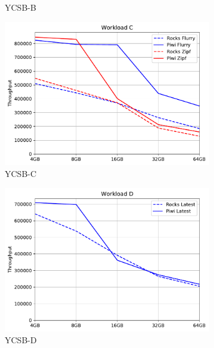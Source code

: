 \begin{figure}[tb]
\begin{subfigure}{0.3\linewidth}
\caption{YCSB-B}
\label{fig:throughput:b}
\end{subfigure}
\begin{subfigure}{0.3\linewidth}
\includegraphics[width=\textwidth]{figs/Workload_C_line.pdf}
\caption{YCSB-C}
\label{fig:throughput:c}
\end{subfigure}
\begin{subfigure}{0.3\linewidth}
\includegraphics[width=\textwidth]{figs/Workload_D_line.pdf}
\caption{YCSB-D}
\label{fig:throughput:d}
\end{subfigure}
\begin{subfigure}{0.3\linewidth}

\end{subfigure}
\end{figure}
